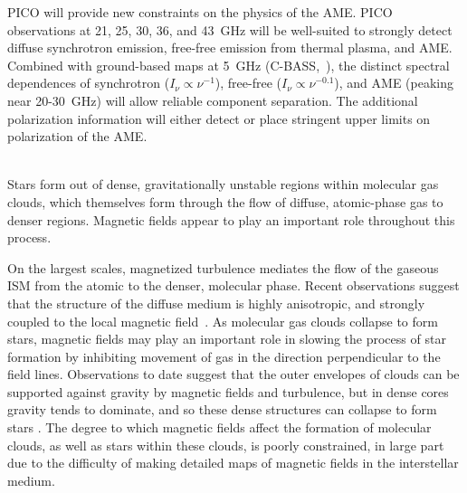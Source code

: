 \documentclass[PICOReport.tex]{subfiles}
\begin{document}
PICO will provide new constraints on the physics of the \ac{AME}. PICO observations at 21, 25, 30, 36, and 43~GHz will be well-suited to strongly detect diffuse synchrotron emission, free-free emission from thermal plasma, and \ac{AME}. Combined with ground-based maps at 5~GHz (C-BASS,~\citep{Dickinson2018a}), the distinct spectral dependences of synchrotron ($I_{\nu} \propto {\nu}^{-1}$), free-free ($I_{\nu} \propto {\nu}^{-0.1}$), and \ac{AME} (peaking near 20-30~GHz) will allow reliable component separation. The additional polarization information will either detect or place stringent upper limits on polarization of the \ac{AME}. 

 \\
Stars form out of dense, gravitationally unstable regions within molecular gas clouds, which themselves form through the flow of diffuse, atomic-phase gas to denser regions. Magnetic fields appear to play an important role throughout this process. 

On the largest scales, magnetized turbulence mediates the flow of the gaseous \ac{ISM} from the atomic to the denser, molecular phase. Recent observations suggest that the structure of the diffuse medium is highly anisotropic, and strongly coupled to the local magnetic field~\citep{Clark:2014, Clark:2015, Kalberla:2016, KalberlaKerp:2016}. 
As molecular gas clouds collapse to form stars, magnetic fields may play an important role in slowing the process of star formation by inhibiting movement of gas in the direction perpendicular to the field lines. Observations to date suggest that the outer envelopes of clouds can be supported against gravity by magnetic fields and turbulence, but in dense cores gravity tends to dominate, and so these dense structures can collapse to form stars \citep{Crutcher2010}.  The degree to which magnetic fields affect the formation of molecular clouds, as well as stars within these clouds,  is poorly constrained, in large part due to the difficulty of making detailed maps of magnetic fields in the interstellar medium.
\end{document}
